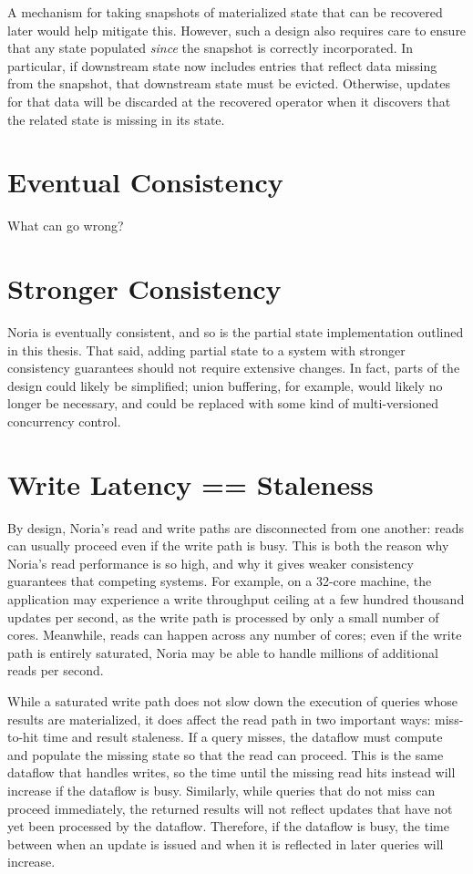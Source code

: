 A mechanism for taking snapshots of materialized state that can be recovered
later would help mitigate this. However, such a design also requires care to
ensure that any state populated \emph{since} the snapshot is correctly
incorporated. In particular, if downstream state now includes entries that
reflect data missing from the snapshot, that downstream state must be evicted.
Otherwise, updates for that data will be discarded at the recovered operator
when it discovers that the related state is missing in its state.

\section{Eventual Consistency}

\begin{inprogress}
  What can go wrong?
\end{inprogress}

\section{Stronger Consistency}

Noria is eventually consistent, and so is the partial state implementation
outlined in this thesis. That said, adding partial state to a system with
stronger consistency guarantees should not require extensive changes. In fact,
parts of the design could likely be simplified; union buffering, for example,
would likely no longer be necessary, and could be replaced with some kind of
multi-versioned concurrency control.

\section{Write Latency == Staleness}

By design, Noria's read and write paths are disconnected from one another: reads
can usually proceed even if the write path is busy. This is both the reason why
Noria's read performance is so high, and why it gives weaker consistency
guarantees that competing systems. For example, on a 32-core machine, the
application may experience a write throughput ceiling at a few hundred thousand
updates per second, as the write path is processed by only a small number of
cores. Meanwhile, reads can happen across any number of cores; even if the write
path is entirely saturated, Noria may be able to handle millions of additional
reads per second.

While a saturated write path does not slow down the execution of queries whose
results are materialized, it does affect the read path in two important ways:
miss-to-hit time and result staleness. If a query misses, the dataflow must
compute and populate the missing state so that the read can proceed. This is the
same dataflow that handles writes, so the time until the missing read hits
instead will increase if the dataflow is busy. Similarly, while queries that do
not miss can proceed immediately, the returned results will not reflect updates
that have not yet been processed by the dataflow. Therefore, if the dataflow is
busy, the time between when an update is issued and when it is reflected in
later queries will increase.

